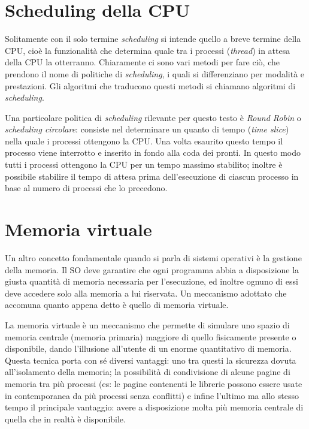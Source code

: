 \section{Scheduling della CPU}
Solitamente con il solo termine \textit{scheduling} si intende quello a breve termine della CPU, cioè la funzionalità che determina quale tra i processi (\textit{thread}) in attesa della CPU la otterranno. Chiaramente ci sono vari metodi per fare ciò, che prendono il nome di politiche di \textit{scheduling}, i quali si differenziano per modalità e prestazioni. Gli algoritmi che traducono questi metodi si chiamano algoritmi di \textit{scheduling}.

Una particolare politica di \textit{scheduling} rilevante per questo testo è \textit{Round Robin} o \textit{scheduling circolare}: consiste nel determinare un quanto di tempo (\textit{time slice}) nella quale i processi ottengono la CPU. Una volta esaurito questo tempo il processo viene interrotto e inserito in fondo alla coda dei pronti. In questo modo tutti i processi ottengono la CPU per un tempo massimo stabilito; inoltre è possibile stabilire il tempo di attesa prima dell'esecuzione di ciascun processo in base al numero di processi che lo precedono.

\section{Memoria virtuale}
Un altro concetto fondamentale quando si parla di sistemi operativi è la gestione della memoria. Il SO deve garantire che ogni programma abbia a disposizione la giusta quantità di memoria necessaria per l'esecuzione, ed inoltre ognuno di essi deve accedere solo alla memoria a lui riservata. Un meccanismo adottato che accomuna quanto appena detto è quello di memoria virtuale.

La memoria virtuale è un meccanismo che permette di simulare uno spazio di memoria centrale (memoria primaria) maggiore di quello fisicamente presente o disponibile, dando l'illusione all'utente di un enorme quantitativo di memoria. Questa tecnica porta con sé diversi vantaggi: uno tra questi la sicurezza dovuta all'isolamento della memoria; la possibilità di condivisione di alcune pagine di memoria tra più processi (es: le pagine contenenti le librerie possono essere usate in contemporanea da più processi senza conflitti) e infine l'ultimo ma allo stesso tempo il principale vantaggio: avere a disposizione molta più memoria centrale di quella che in realtà è disponibile. 

